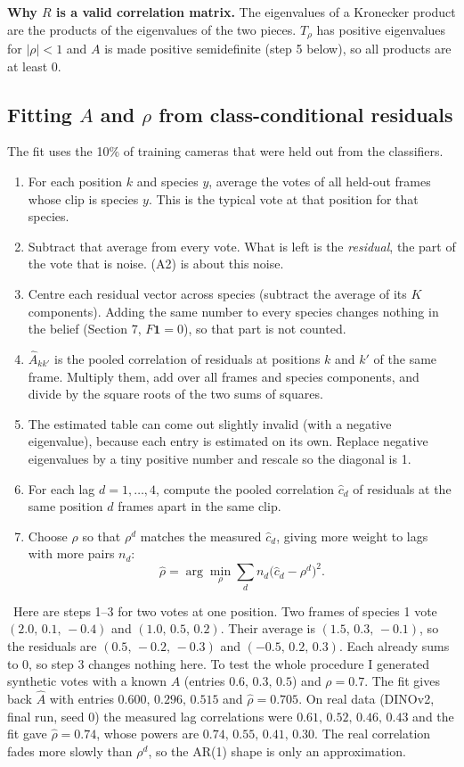 \documentclass[11pt]{article}
\newcommand{\one}{\mathbf{1}}
\newcommand{\CheckNum}{\par\smallskip\noindent{\sffamily\bfseries\color{headblue}Check with numbers.}\ }
\newenvironment{steps}{\begin{enumerate}[label=\textbf{\arabic*.},leftmargin=2em,itemsep=6pt]}{\end{enumerate}}
\begin{document}
\textbf{Why $R$ is a valid correlation matrix.} The eigenvalues of a Kronecker product are the products of the eigenvalues of the two pieces. $T_\rho$ has positive eigenvalues for $|\rho|<1$ and $A$ is made positive semidefinite (step 5 below), so all products are at least 0.

\subsection{\texorpdfstring{Fitting $A$ and $\rho$ from class-conditional residuals}{Fitting A and rho from class-conditional residuals}}

The fit uses the 10\% of training cameras that were held out from the classifiers.
\begin{steps}
  \item For each position $k$ and species $y$, average the votes of all held-out frames whose clip is species $y$. This is the typical vote at that position for that species.
  \item Subtract that average from every vote. What is left is the \emph{residual}, the part of the vote that is noise. (A2) is about this noise.
  \item Centre each residual vector across species (subtract the average of its $K$ components). Adding the same number to every species changes nothing in the belief (Section 7, $F\one=0$), so that part is not counted.
  \item $\hat A_{kk'}$ is the pooled correlation of residuals at positions $k$ and $k'$ of the same frame. Multiply them, add over all frames and species components, and divide by the square roots of the two sums of squares.
  \item The estimated table can come out slightly invalid (with a negative eigenvalue), because each entry is estimated on its own. Replace negative eigenvalues by a tiny positive number and rescale so the diagonal is 1.
  \item For each lag $d=1,\dots,4$, compute the pooled correlation $\hat c_d$ of residuals at the same position $d$ frames apart in the same clip.
  \item Choose $\rho$ so that $\rho^d$ matches the measured $\hat c_d$, giving more weight to lags with more pairs $n_d$:
  \[ \hat\rho=\arg\min_\rho\sum_d n_d\big(\hat c_d-\rho^d\big)^2. \]
\end{steps}

\CheckNum Here are steps 1--3 for two votes at one position. Two frames of species 1 vote $(2.0,\,0.1,\,-0.4)$ and $(1.0,\,0.5,\,0.2)$. Their average is $(1.5,\,0.3,\,-0.1)$, so the residuals are $(0.5,\,-0.2,\,-0.3)$ and $(-0.5,\,0.2,\,0.3)$. Each already sums to 0, so step 3 changes nothing here. To test the whole procedure I generated synthetic votes with a known $A$ (entries $0.6,\,0.3,\,0.5$) and $\rho=0.7$. The fit gives back $\hat A$ with entries $0.600,\,0.296,\,0.515$ and $\hat\rho=0.705$. On real data (DINOv2, final run, seed 0) the measured lag correlations were $0.61,\,0.52,\,0.46,\,0.43$ and the fit gave $\hat\rho=0.74$, whose powers are $0.74,\,0.55,\,0.41,\,0.30$. The real correlation fades more slowly than $\rho^d$, so the AR(1) shape is only an approximation.
\end{document}
